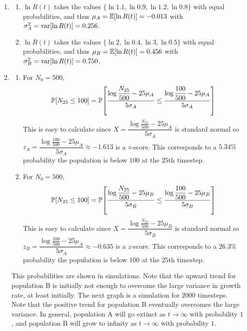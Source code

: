\documentclass{article} %
\theoremstyle{plain}
\newcommand{\expec}[1]{\mathbb{E}\qty[#1]}
\newcommand{\prob}[1]{\mathbb{P}\qty[#1]}
\newcommand{\vari}[1]{\text{var}\qty[#1]}
\numberwithin{equation}{section} %
\numberwithin{figure}{section} %
\numberwithin{table}{section} %
\begin{document}
\begin{enumerate}[\ \ (a)]
    \item
        \begin{enumerate}[Pop.~A:\ ]
            \item
                $\ln R(t)$ takes the values $\{\ln1.1, \ln0.9, \ln1.2, \ln0.8\}$ with equal probabilities, and thus $\mu_A = \expec{\ln R(t)} = -0.013$ with $\sigma_A^2 = \vari{\ln R(t)} = 0.256$.
            \item
                $\ln R(t)$ takes the values $\{\ln2,\ln0.4,\ln3,\ln0.5\}$ with equal probabilities, and thus $\mu_B = \expec{\ln R(t)} = 0.456$ with $\sigma_B^2 = \vari{\ln R(t)} = 0.750$.
        \end{enumerate}
    \item
        \begin{enumerate}[Pop.~A:\ ]
            \item
                For $N_0 = 500$,
                \begin{align*}
                    \prob{N_{25}\leq 100} = \prob{\frac{\log \dfrac{N_{25}}{500} - 25\mu_A}{5\sigma_A} \leq \frac{\log\dfrac{100}{500} - 25\mu_A}{5\sigma_A}}
                \end{align*}
                This is easy to calculate since $X = \dfrac{\log \frac{N_{25}}{500} - 25\mu_A}{5\sigma_A}$ is standard normal so $z_A = \dfrac{\log\frac{100}{500} - 25\mu_A}{5\sigma_A} \approx -1.613$ is a $z$-score.  This corresponds to a $5.34\%$ probability the population is below $100$ at the $25$th timestep.
            \item
                For $N_0 = 500$,
                \begin{align*}
                    \prob{N_{25}\leq 100} = \prob{\frac{\log \dfrac{N_{25}}{500} - 25\mu_B}{5\sigma_B} \leq \frac{\log\dfrac{100}{500} - 25\mu_B}{5\sigma_B}}
                \end{align*}
                This is easy to calculate since $X = \dfrac{\log \frac{N_{25}}{500} - 25\mu_B}{5\sigma_B}$ is standard normal so $z_B = \dfrac{\log\frac{100}{500} - 25\mu_A}{5\sigma_A} \approx -0.635$ is a $z$-score.  This corresponds to a $26.3\%$ probability the population is below $100$ at the $25$th timestep.
        \end{enumerate}
        This probabilities are shown in simulations.  Note that the upward trend for population B is initially not enough to overcome the large variance in growth rate, at least initially.  The next graph is a simulation for $2000$ timesteps.  Note that the positive trend for population B eventually overcomes the large variance.  In general, population A will go extinct as $t \rightarrow \infty$ with probability $1$, and population B will grow to infinity as $t \rightarrow \infty$ with probability $1$.

\end{enumerate}
\end{document}
